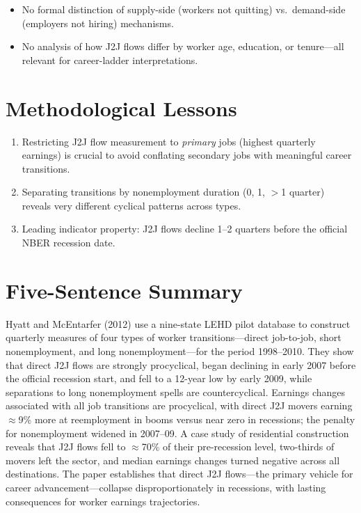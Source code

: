 \begin{itemize}
  \item No formal distinction of supply-side (workers not quitting) vs.\
    demand-side (employers not hiring) mechanisms.
  \item No analysis of how J2J flows differ by worker age, education, or
    tenure---all relevant for career-ladder interpretations.
\end{itemize}

\section{Methodological Lessons}

\begin{enumerate}
  \item Restricting J2J flow measurement to \emph{primary} jobs (highest
    quarterly earnings) is crucial to avoid conflating secondary jobs with
    meaningful career transitions.
  \item Separating transitions by nonemployment duration (0, 1, $>$1 quarter)
    reveals very different cyclical patterns across types.
  \item Leading indicator property: J2J flows decline 1--2 quarters before the
    official NBER recession date.
\end{enumerate}

\section*{Five-Sentence Summary}

Hyatt and McEntarfer (2012) use a nine-state LEHD pilot database to construct
quarterly measures of four types of worker transitions---direct job-to-job,
short nonemployment, and long nonemployment---for the period 1998--2010. They
show that direct J2J flows are strongly procyclical, began declining in early
2007 before the official recession start, and fell to a 12-year low by early
2009, while separations to long nonemployment spells are countercyclical.
Earnings changes associated with all job transitions are procyclical, with
direct J2J movers earning $\approx$9\% more at reemployment in booms versus
near zero in recessions; the penalty for nonemployment widened in 2007--09.
A case study of residential construction reveals that J2J flows fell to
$\approx$70\% of their pre-recession level, two-thirds of movers left the
sector, and median earnings changes turned negative across all destinations.
The paper establishes that direct J2J flows---the primary vehicle for career
advancement---collapse disproportionately in recessions, with lasting
consequences for worker earnings trajectories.

